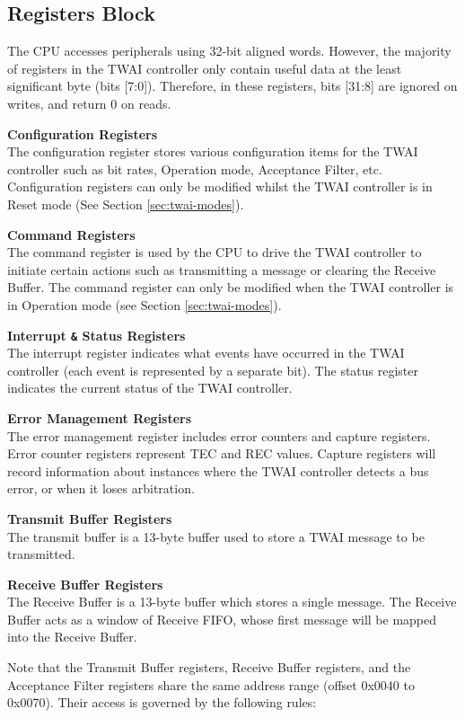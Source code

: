 \documentclass[main\_\_EN.tex]{subfiles}
\begin{document}
\subsection{Registers Block}
The \chipname{} CPU accesses peripherals using 32-bit aligned words. However, the majority of registers in the TWAI controller only contain useful data at the least significant byte (bits [7:0]). Therefore, in these registers, bits [31:8] are ignored on writes, and return 0 on reads.

{\bfseries Configuration Registers}\\
The configuration register stores various configuration items for the TWAI controller such as bit rates, Operation mode, Acceptance Filter, etc. Configuration registers can only be modified whilst the TWAI controller is in Reset mode (See Section \ref{sec:twai-modes}).

{\bfseries Command Registers}\\
The command register is used by the CPU to drive the TWAI controller to initiate certain actions such as transmitting a message or clearing the Receive Buffer. The command register can only be modified when the TWAI controller is in Operation mode (see Section \ref{sec:twai-modes}).

{\bfseries Interrupt \verb+&+ Status Registers}\\
The interrupt register indicates what events have occurred in the TWAI controller (each event is represented by a separate bit). The status register indicates the current status of the TWAI controller.

{\bfseries Error Management Registers}\\
The error management register includes error counters and capture registers. Error counter registers represent TEC and REC values. Capture registers will record information about instances where the TWAI controller detects a bus error, or when it loses arbitration.

{\bfseries Transmit Buffer Registers}\\
The transmit buffer is a 13-byte buffer used to store a TWAI message to be transmitted.

{\bfseries Receive Buffer Registers}\\
The Receive Buffer is a 13-byte buffer which stores a single message. The Receive Buffer acts as a window of Receive FIFO, whose first message will be mapped into the Receive Buffer.

Note that the Transmit Buffer registers, Receive Buffer registers, and the Acceptance Filter registers share the same address range (offset 0x0040 to 0x0070). Their access is governed by the following rules:
\end{document}
